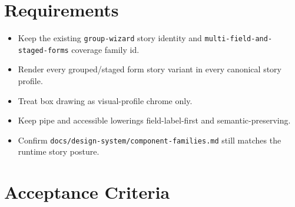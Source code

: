 \section{Requirements}\label{record-097-requirements}

\begin{itemize}
\tightlist
\item
  Keep the existing \texttt{g\allowbreak{}r\allowbreak{}o\allowbreak{}u\allowbreak{}p\allowbreak{}-\allowbreak{}w\allowbreak{}i\allowbreak{}z\allowbreak{}a\allowbreak{}r\allowbreak{}d} story identity and \texttt{m\allowbreak{}u\allowbreak{}l\allowbreak{}t\allowbreak{}i\allowbreak{}-\allowbreak{}f\allowbreak{}i\allowbreak{}e\allowbreak{}l\allowbreak{}d\allowbreak{}-\allowbreak{}a\allowbreak{}n\allowbreak{}d\allowbreak{}-\allowbreak{}s\allowbreak{}t\allowbreak{}a\allowbreak{}g\allowbreak{}e\allowbreak{}d\allowbreak{}-\allowbreak{}f\allowbreak{}o\allowbreak{}r\allowbreak{}m\allowbreak{}s} coverage family id.
\item
  Render every grouped/staged form story variant in every canonical story profile.
\item
  Treat box drawing as visual-profile chrome only.
\item
  Keep pipe and accessible lowerings field-label-first and semantic-preserving.
\item
  Confirm \texttt{d\allowbreak{}o\allowbreak{}c\allowbreak{}s\allowbreak{}/\allowbreak{}d\allowbreak{}e\allowbreak{}s\allowbreak{}i\allowbreak{}g\allowbreak{}n\allowbreak{}-\allowbreak{}s\allowbreak{}y\allowbreak{}s\allowbreak{}t\allowbreak{}e\allowbreak{}m\allowbreak{}/\allowbreak{}c\allowbreak{}o\allowbreak{}m\allowbreak{}p\allowbreak{}o\allowbreak{}n\allowbreak{}e\allowbreak{}n\allowbreak{}t\allowbreak{}-\allowbreak{}f\allowbreak{}a\allowbreak{}m\allowbreak{}i\allowbreak{}l\allowbreak{}i\allowbreak{}e\allowbreak{}s\allowbreak{}.\allowbreak{}m\allowbreak{}d} still matches the runtime story posture.
\end{itemize}

\section{Acceptance Criteria}\label{record-097-acceptance-criteria}

